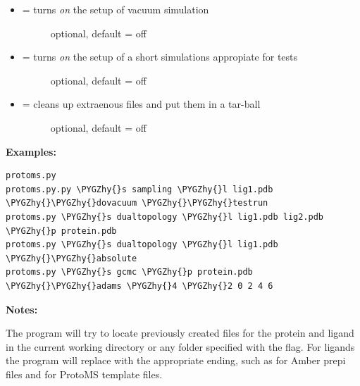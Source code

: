 \documentclass[letterpaper,10pt,english]{sphinxmanual}
\def\PYGZhy{\char`\-}
\begin{document}
\begin{itemize}
\begin{description}
\end{description}

\item {} \begin{description}
\item[{ = turns \emph{on} the setup of vacuum simulation}] \leavevmode
optional, default = off

\end{description}

\item {} \begin{description}
\item[{ = turns \emph{on} the setup of a short simulations appropiate for tests}] \leavevmode
optional, default = off

\end{description}

\item {} \begin{description}
\item[{ = cleans up extraenous files and put them in a tar-ball}] \leavevmode
optional, default = off

\end{description}

\end{itemize}

\textbf{Examples:}

\begin{Verbatim}[commandchars=\\\{\}]
protoms.py
protoms.py.py \PYGZhy{}s sampling \PYGZhy{}l lig1.pdb \PYGZhy{}\PYGZhy{}dovacuum \PYGZhy{}\PYGZhy{}testrun
protoms.py \PYGZhy{}s dualtopology \PYGZhy{}l lig1.pdb lig2.pdb \PYGZhy{}p protein.pdb
protoms.py \PYGZhy{}s dualtopology \PYGZhy{}l lig1.pdb \PYGZhy{}\PYGZhy{}absolute
protoms.py \PYGZhy{}s gcmc \PYGZhy{}p protein.pdb \PYGZhy{}\PYGZhy{}adams \PYGZhy{}4 \PYGZhy{}2 0 2 4 6
\end{Verbatim}

\textbf{Notes:}

The program will try to locate previously created files for the protein and ligand in the current working directory or any folder specified with the  flag. For ligands the program will replace  with the appropriate ending, such as  for Amber prepi files and  for ProtoMS template files.
\end{document}
